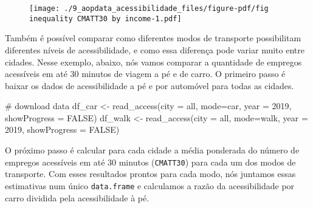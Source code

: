\documentclass[
  letterpaper,
  DIV=11,
  numbers=noendperiod]{scrreprt}
\newenvironment{Shaded}{\begin{snugshade}}{\end{snugshade}}
\newcommand{\AttributeTok}[1]{\textcolor[rgb]{0.40,0.45,0.13}{#1}}
\newcommand{\CommentTok}[1]{\textcolor[rgb]{0.37,0.37,0.37}{#1}}
\newcommand{\ConstantTok}[1]{\textcolor[rgb]{0.56,0.35,0.01}{#1}}
\newcommand{\DecValTok}[1]{\textcolor[rgb]{0.68,0.00,0.00}{#1}}
\newcommand{\FunctionTok}[1]{\textcolor[rgb]{0.28,0.35,0.67}{#1}}
\newcommand{\NormalTok}[1]{\textcolor[rgb]{0.00,0.23,0.31}{#1}}
\newcommand{\OtherTok}[1]{\textcolor[rgb]{0.00,0.23,0.31}{#1}}
\newcommand{\StringTok}[1]{\textcolor[rgb]{0.13,0.47,0.30}{#1}}
\begin{document}
\begin{figure}[H]

{\centering \texttt{[image: ./9\_aopdata\_acessibilidade\_files/figure-pdf/fig inequality CMATT30 by income-1.pdf]}

}

\end{figure}

Também é possível comparar como diferentes modos de transporte
possibilitam diferentes níveis de acessibilidade, e como essa diferença
pode variar muito entre cidades. Nesse exemplo, abaixo, nós vamos
comparar a quantidade de empregos acessíveis em até 30 minutos de viagem
a pé e de carro. O primeiro passo é baixar os dados de acessibilidade a
pé e por automóvel para todas as cidades.

\begin{Shaded}
\begin{Highlighting}[]
\CommentTok{\# download data}
\NormalTok{df\_car }\OtherTok{\textless{}{-}} \FunctionTok{read\_access}\NormalTok{(}\AttributeTok{city =} \StringTok{\textquotesingle{}all\textquotesingle{}}\NormalTok{, }\AttributeTok{mode=}\StringTok{\textquotesingle{}car\textquotesingle{}}\NormalTok{, }\AttributeTok{year =} \DecValTok{2019}\NormalTok{, }\AttributeTok{showProgress =} \ConstantTok{FALSE}\NormalTok{)}
\NormalTok{df\_walk }\OtherTok{\textless{}{-}} \FunctionTok{read\_access}\NormalTok{(}\AttributeTok{city =} \StringTok{\textquotesingle{}all\textquotesingle{}}\NormalTok{, }\AttributeTok{mode=}\StringTok{\textquotesingle{}walk\textquotesingle{}}\NormalTok{, }\AttributeTok{year =} \DecValTok{2019}\NormalTok{, }\AttributeTok{showProgress =} \ConstantTok{FALSE}\NormalTok{)}
\end{Highlighting}
\end{Shaded}

O próximo passo é calcular para cada cidade a média ponderada do número
de empregos acessíveis em até 30 minutos (\texttt{CMATT30}) para cada um
dos modos de transporte. Com esses resultados prontos para cada modo,
nós juntamos essas estimativas num único \texttt{data.frame} e
calculamos a razão da acessibilidade por carro dividida pela
acessibilidade à pé.
\end{document}
